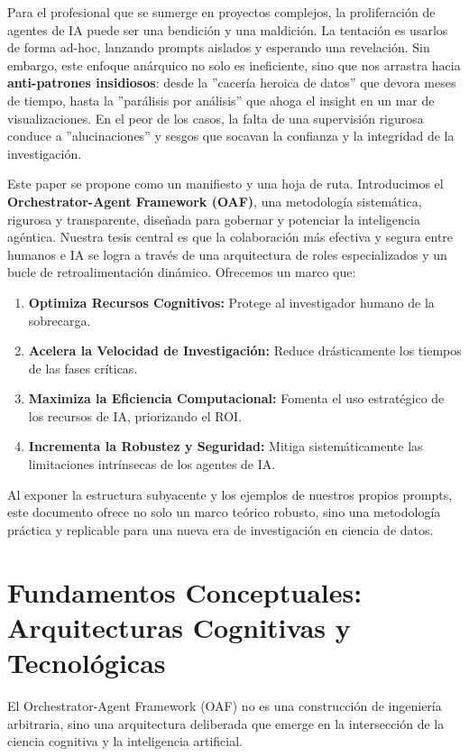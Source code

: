 \documentclass[11pt, a4paper]{article}
\begin{document}
Para el profesional que se sumerge en proyectos complejos, la proliferación de agentes de IA puede ser una bendición y una maldición. La tentación es usarlos de forma ad-hoc, lanzando prompts aislados y esperando una revelación. Sin embargo, este enfoque anárquico no solo es ineficiente, sino que nos arrastra hacia \textbf{anti-patrones insidiosos}: desde la ''cacería heroica de datos'' que devora meses de tiempo, hasta la ''parálisis por análisis'' que ahoga el insight en un mar de visualizaciones. En el peor de los casos, la falta de una supervisión rigurosa conduce a ''alucinaciones'' y sesgos que socavan la confianza y la integridad de la investigación.

Este paper se propone como un manifiesto y una hoja de ruta. Introducimos el \textbf{Orchestrator-Agent Framework (OAF)}, una metodología sistemática, rigurosa y transparente, diseñada para gobernar y potenciar la inteligencia agéntica. Nuestra tesis central es que la colaboración más efectiva y segura entre humanos e IA se logra a través de una arquitectura de roles especializados y un bucle de retroalimentación dinámico. Ofrecemos un marco que:
\begin{enumerate}
    \item \textbf{Optimiza Recursos Cognitivos:} Protege al investigador humano de la sobrecarga.
    \item \textbf{Acelera la Velocidad de Investigación:} Reduce drásticamente los tiempos de las fases críticas.
    \item \textbf{Maximiza la Eficiencia Computacional:} Fomenta el uso estratégico de los recursos de IA, priorizando el ROI.
    \item \textbf{Incrementa la Robustez y Seguridad:} Mitiga sistemáticamente las limitaciones intrínsecas de los agentes de IA.
\end{enumerate}
Al exponer la estructura subyacente y los ejemplos de nuestros propios prompts, este documento ofrece no solo un marco teórico robusto, sino una metodología práctica y replicable para una nueva era de investigación en ciencia de datos.

\section{Fundamentos Conceptuales: Arquitecturas Cognitivas y Tecnológicas}
\label{sec:fundamentos}

El Orchestrator-Agent Framework (OAF) no es una construcción de ingeniería arbitraria, sino una arquitectura deliberada que emerge en la intersección de la ciencia cognitiva y la inteligencia artificial. 
\end{document}
